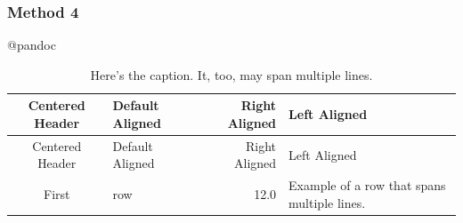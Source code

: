 \documentclass[]{article}
\begin{document}
\subsubsection{Method 4}\label{method-4}

@pandoc

\begin{longtable}[]{@{}clrl@{}}
\caption{Here's the caption. It, too, may span multiple
lines.}\tabularnewline
\toprule
\begin{minipage}[b]{0.15\columnwidth}\centering\strut
Centered Header
\strut\end{minipage} &
\begin{minipage}[b]{0.10\columnwidth}\raggedright\strut
Default Aligned
\strut\end{minipage} &
\begin{minipage}[b]{0.20\columnwidth}\raggedleft\strut
Right Aligned
\strut\end{minipage} &
\begin{minipage}[b]{0.31\columnwidth}\raggedright\strut
Left Aligned
\strut\end{minipage}\tabularnewline
\midrule
\endfirsthead
\toprule
\begin{minipage}[b]{0.15\columnwidth}\centering\strut
Centered Header
\strut\end{minipage} &
\begin{minipage}[b]{0.10\columnwidth}\raggedright\strut
Default Aligned
\strut\end{minipage} &
\begin{minipage}[b]{0.20\columnwidth}\raggedleft\strut
Right Aligned
\strut\end{minipage} &
\begin{minipage}[b]{0.31\columnwidth}\raggedright\strut
Left Aligned
\strut\end{minipage}\tabularnewline
\midrule
\endhead
\begin{minipage}[t]{0.15\columnwidth}\centering\strut
First
\strut\end{minipage} &
\begin{minipage}[t]{0.10\columnwidth}\raggedright\strut
row
\strut\end{minipage} &
\begin{minipage}[t]{0.20\columnwidth}\raggedleft\strut
12.0
\strut\end{minipage} &
\begin{minipage}[t]{0.31\columnwidth}\raggedright\strut
Example of a row that spans multiple lines.
\strut\end{minipage}\tabularnewline

\end{longtable}
\end{document}
